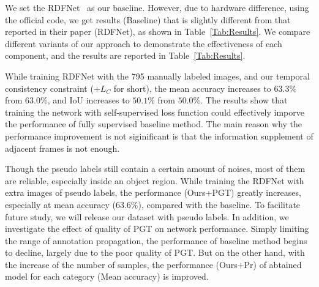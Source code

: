 We set the RDFNet~\cite{Park2017} as our baseline. 
However, due to hardware difference, using the official code, we get results (Baseline) that is slightly different from that reported in their paper (RDFNet), as shown in Table~\ref{Tab:Results}. 
We compare different variants of our approach to demonstrate the effectiveness of each component, and the results are reported in Table~\ref{Tab:Results}. 

 While training RDFNet with the 795 manually labeled images, and our temporal consistency constraint (+$L_C$ for short), the mean accuracy increases to $63.3\%$ from $63.0\%$, and IoU increases to $50.1\%$ from $50.0\%$. 
%
The results show that training the network with self-supervised loss function could effectively imporve the performance of fully supervised baseline method.
%
The main reason why the performance improvement is not siginificant is that the information supplement of adjacent frames is not enough.

Though the pseudo labels still contain a certain amount of noises, most of them are reliable, especially inside an object region. 
%
While training the RDFNet with extra images of pseudo labels, the performance (Ours+PGT) greatly increases, especially at mean accuracy ($63.6\%$), compared with the baseline.
%
To facilitate future study, we will release our dataset with pseudo labels.
%
In addition, we investigate the effect of quality of PGT on network performance.
%
Simply limiting the range of annotation propagation, the performance of baseline method begins to decline, largely due to the poor quality of PGT.
%
But on the other hand, with the increase of the number of samples, the performance (Ours+Pr) of abtained model for each category (Mean accuracy) is improved.


